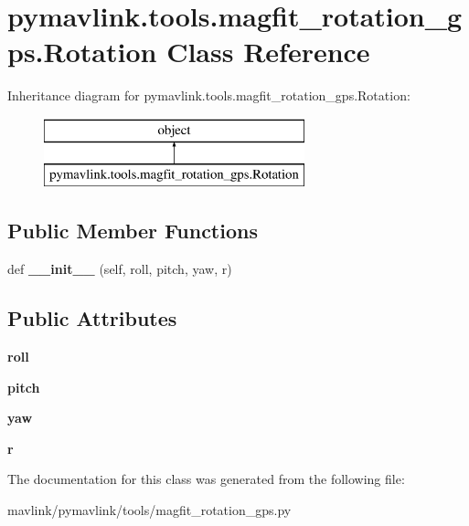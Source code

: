 \hypertarget{classpymavlink_1_1tools_1_1magfit__rotation__gps_1_1Rotation}{}\section{pymavlink.\+tools.\+magfit\+\_\+rotation\+\_\+gps.\+Rotation Class Reference}
\label{classpymavlink_1_1tools_1_1magfit__rotation__gps_1_1Rotation}
Inheritance diagram for pymavlink.\+tools.\+magfit\+\_\+rotation\+\_\+gps.\+Rotation\+:\begin{figure}[H]
\begin{center}
\leavevmode
\includegraphics[height=2.000000cm]{classpymavlink_1_1tools_1_1magfit__rotation__gps_1_1Rotation}
\end{center}
\end{figure}
\subsection*{Public Member Functions}
\begin{DoxyCompactItemize}
\item 
\mbox{\label{classpymavlink_1_1tools_1_1magfit__rotation__gps_1_1Rotation_ab9be0c622fdf8819fd9032e96ab74ee9}} 
def {\bfseries \+\_\+\+\_\+init\+\_\+\+\_\+} (self, roll, pitch, yaw, r)
\end{DoxyCompactItemize}
\subsection*{Public Attributes}
\begin{DoxyCompactItemize}
\item 
\mbox{\label{classpymavlink_1_1tools_1_1magfit__rotation__gps_1_1Rotation_ac9addebff65d541f375c09c188e2e83f}} 
{\bfseries roll}
\item 
\mbox{\label{classpymavlink_1_1tools_1_1magfit__rotation__gps_1_1Rotation_a8a31d2a8c800f4307645b97d6b2ca793}} 
{\bfseries pitch}
\item 
\mbox{\label{classpymavlink_1_1tools_1_1magfit__rotation__gps_1_1Rotation_a9b8dd59a13f8403b401a94e2edaae9e5}} 
{\bfseries yaw}
\item 
\mbox{\label{classpymavlink_1_1tools_1_1magfit__rotation__gps_1_1Rotation_a4cc244f5b1cd984bcbef5962e620a7a1}} 
{\bfseries r}
\end{DoxyCompactItemize}


The documentation for this class was generated from the following file\+:\begin{DoxyCompactItemize}
\item 
mavlink/pymavlink/tools/magfit\+\_\+rotation\+\_\+gps.\+py\end{DoxyCompactItemize}

